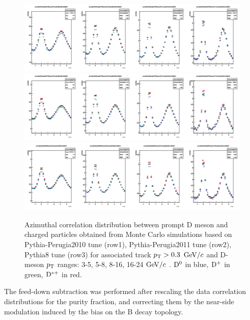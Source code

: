 \begin{figure}
\centering
\includegraphics[width=1\linewidth]{figures/Template/1DCompare_allDpTfromC_AssoPt_0dot3to99dot0GeVc_Perugia2010.png}
\includegraphics[width=1\linewidth]{figures/Template/1DCompare_allDpTfromC_AssoPt_0dot3to99dot0GeVc_Perugia2011.png}
\includegraphics[width=1\linewidth]{figures/Template/1DCompare_allDpTfromC_AssoPt_0dot3to99dot0GeVc_Pythia8.png}
\caption{Azimuthal correlation distribution between prompt D meson and charged particles obtained from Monte Carlo simulations
based on Pythia-Perugia2010 tune (row1), Pythia-Perugia2011 tune (row2), Pythia8 tune (row3) for associated track $p_{\rm T} > 0.3$ $\mathrm{GeV}/c$  and D-meson $p_{\rm T}$ ranges: 3-5, 5-8, 8-16, 16-24 $\mathrm{GeV}/c$ . ${\rm D^0}$ in blue, ${\rm D^+}$ in green, ${\rm D^{*+}}$ in red.}
\label{templates2}
\end{figure}

The feed-down subtraction was performed after rescaling the data correlation distributions for the purity fraction, and correcting them by the near-side modulation induced by the bias on the B decay topology.

\clearpage

\newpage %

